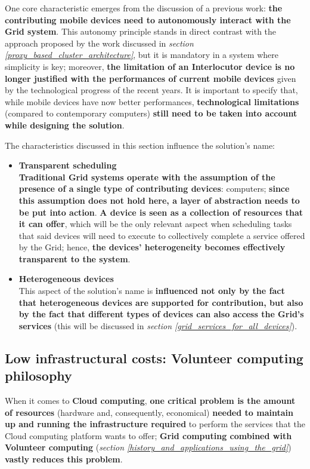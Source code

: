 One core characteristic emerges from the discussion of a previous work: \textbf{the contributing mobile devices need to autonomously interact with the Grid system}.
This autonomy principle stands in direct contrast with the approach proposed by the work discussed in \textit{section \ref{proxy_based_cluster_architecture}}, but it is mandatory in a system where simplicity is key; moreover, \textbf{the limitation of an Interlocutor device is no longer justified with the performances of current mobile devices} given by the technological progress of the recent years. It is important to specify that, while mobile devices have now better performances, \textbf{technological limitations} (compared to contemporary computers) \textbf{still need to be taken into account while designing the solution}.

The characteristics discussed in this section influence the solution's name:
\begin{itemize}
    \item \textbf{Transparent scheduling}\\
    \textbf{Traditional Grid systems operate with the assumption of the presence of a single type of contributing devices}: computers; \textbf{since this assumption does not hold here, a layer of abstraction needs to be put into action}. \textbf{A device is seen as a collection of resources that it can offer}, which will be the only relevant aspect when scheduling tasks that said devices will need to execute to collectively complete a service offered by the Grid; hence, \textbf{the devices' heterogeneity becomes effectively transparent to the system}.
    \item \textbf{Heterogeneous devices}\\
    This aspect of the solution's name is \textbf{influenced not only by the fact that heterogeneous devices are supported for contribution, but also by the fact that different types of devices can also access the Grid's services} (this will be discussed in \textit{section \ref{grid_services_for_all_devices}}).
\end{itemize}

\subsection{Low infrastructural costs: Volunteer computing philosophy}\label{low_infrastructural_costs_volunteer_computing_philosophy}
When it comes to \textbf{Cloud computing}, \textbf{one critical problem is the amount of resources} (hardware and, consequently, economical) \textbf{needed to maintain up and running the infrastructure required} to perform the services that the Cloud computing platform wants to offer; \textbf{Grid computing combined with Volunteer computing} (\textit{section \ref{history_and_applications_using_the_grid}}) \textbf{vastly reduces this problem}.

